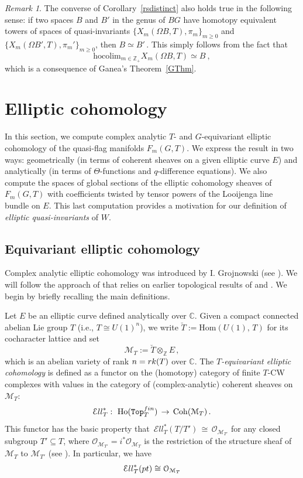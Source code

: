 \documentclass[11pt]{amsart}
\theoremstyle{definition}
\theoremstyle{remark}
\newtheorem{remark}[theorem]{Remark}
\numberwithin{equation}{section}
\newcommand{\la}{\label}
\newcommand{\Ho}{\mathrm{Ho}}
\newcommand{\hocolim}{\mathrm{hocolim}}
\newcommand{\Top}{\mathtt{Top}}
\def\c{\mathbb{C}}
\def\M{\mathcal{M}}
\def\Z{\mathbb{Z}}
\def\O{\mathcal{O}}
\def\Hom{\mathrm{Hom}}
\def\Ell{\mathcal{E}{ll}}
\def\Coh{\mathrm{Coh}}
\begin{document}
%
\begin{remark}
The converse of Corollary~\ref{rsdistinct} also holds true in the following sense: if two spaces $B$ and $B'$ in the genus of $BG$ have homotopy equivalent towers of spaces
of quasi-invariants $\{ 
X_m(\Omega B,T), \pi_m\}_{m\ge 0} $ and $ \{X_m(\Omega B',T), \pi_m'\}_{m \ge 0}$, then 
$ B \simeq B' \,$. This simply follows from the fact that 
$$
\hocolim_{m \in \Z_+} X_m(\Omega B, T) \simeq B\ ,
$$
%
which is a consequence of Ganea's Theorem~\ref{GThm}.
\end{remark}
%
\section{Elliptic cohomology}
\la{S7}
In this section, we compute complex analytic $T$- and
$G$-equivariant elliptic cohomology of the quasi-flag manifolds $ F_m(G,T)$. We express the result in two ways: geometrically (in terms of coherent sheaves on a given elliptic curve $E$) and analytically (in terms of $\Theta$-functions and $q$-difference equations). We also compute the spaces of global sections of the elliptic cohomology sheaves of $F_m(G,T)$ with coefficients twisted by tensor powers of the Looijenga line bundle on $E$. This last computation provides a motivation for our definition of {\it elliptic quasi-invariants} 
of $W$.

\subsection{Equivariant elliptic cohomology}
\la{S7.1}
Complex analytic elliptic cohomology was introduced by I. Grojnowski (see \cite{Gr07}). We will follow the approach of \cite{Ga14} that relies on earlier topological results of \cite{An00} and \cite{Ros01}. We begin by briefly recalling the main definitions.

Let $E$ be an elliptic curve defined analytically over $ \c$. Given a compact connected
abelian Lie group $T$ (i.e., $ T \cong U(1)^n $), we write $ \breve{T} := \Hom(U(1),\,T) $ for its cocharacter lattice and set
$$ 
\M_T := \breve{T} \otimes_{\Z} E \,,
$$
which is an abelian variety of rank $ n = {\rm rk}(T) $ over $\c$. The {\it $T$-equivariant elliptic cohomology} is defined as a functor on the (homotopy) category of finite $T$-CW complexes with values in the category of (complex-analytic) coherent sheaves on $ \M_T $:
%
\begin{equation}
\la{EllT}
\Ell_T^*:\ \Ho(\Top_T^{\rm fin})\,\to\, \Coh(\M_T)\,.
\end{equation}
%
This functor has the basic property that $\,\Ell_T^*(T/T')\,\cong\, \O_{\M_{T'}} $
for any closed subgroup $ T' \subseteq T $, where  $\O_{\M_{T'}} = i^* \O_{\M_{T}}$ is the restriction of the 
structure sheaf of $ \M_T $ to $ \M_{T'}$ (see \cite[2.1(1)]{Ga14}). In particular, we have 
%
\begin{equation}
\la{prEll}
\Ell_T^*({\rm pt}) \cong \O_{\M_T}
\end{equation}
%
\end{document}
